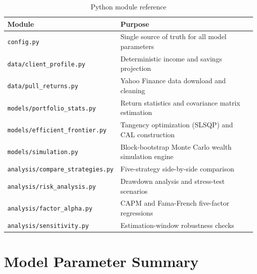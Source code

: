 \documentclass[12pt, letterpaper]{article}
\begin{document}
\begin{table}[H]
  \centering
  \caption{Python module reference}
  \label{tab:code}
  \begin{tabularx}{\linewidth}{lX}
    \toprule
    \textbf{Module} & \textbf{Purpose} \\
    \midrule
    \texttt{config.py}                      & Single source of truth for all model parameters \\
    \texttt{data/client\_profile.py}        & Deterministic income and savings projection \\
    \texttt{data/pull\_returns.py}          & Yahoo Finance data download and cleaning \\
    \texttt{models/portfolio\_stats.py}     & Return statistics and covariance matrix estimation \\
    \texttt{models/efficient\_frontier.py} & Tangency optimization (SLSQP) and CAL construction \\
    \texttt{models/simulation.py}           & Block-bootstrap Monte Carlo wealth simulation engine \\
    \texttt{analysis/compare\_strategies.py}& Five-strategy side-by-side comparison \\
    \texttt{analysis/risk\_analysis.py}     & Drawdown analysis and stress-test scenarios \\
    \texttt{analysis/factor\_alpha.py}      & CAPM and Fama-French five-factor regressions \\
    \texttt{analysis/sensitivity.py}        & Estimation-window robustness checks \\
    \bottomrule
  \end{tabularx}
\end{table}

\section{Model Parameter Summary}
\label{app:params}
\end{document}
